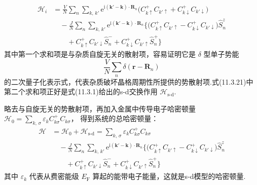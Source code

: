 \begin{equation}
\begin{aligned}
  \mathscr{H}_{i}&=\frac{V}{N}\sum_{n}\sum_{k,\,k'}
  \mathrm{e}^{\mathrm{i}(\boldsymbol{k}'-\boldsymbol{k})\cdot\boldsymbol{R}_{n}}
  \bigl(C^{+}_{k\uparrow}C_{k'\uparrow}
  +C^{+}_{k\downarrow}C_{k'\downarrow}\bigr)\\
  &\quad-\frac{J}{N}\sum_{n}\sum_{k,\,k'}
  \mathrm{e}^{\mathrm{i}(\boldsymbol{k}'-\boldsymbol{k})\cdot\boldsymbol{R}_{n}}
  \bigl\{\bigl(C^{+}_{k\uparrow}C_{k'\uparrow}
  -C^{+}_{k\downarrow}C_{k'\downarrow}\bigr)\hat{S}^{z}_{n}\\
  &\qquad+C^{+}_{k\uparrow}C_{k'\downarrow}\hat{S}^{-}_{n}
  +C^{+}_{k\downarrow}C_{k'\uparrow}\hat{S}^{+}_{n}\bigr\}
\end{aligned}
\end{equation}
其中第一个求和项是与杂质自旋无关的散射项，容易证明它是 $\delta$ 型单子势能
\begin{equation*}
  \frac{V}{N}\sum_{n}\delta(\boldsymbol{r}-\boldsymbol{R}_{n})
\end{equation*}
的二次量子化表示式，代表杂质破坏晶格周期性所提供的势散射项.式(11.3.21)中第二个求和项正好是式(11.3.1)给出的s-d交换作用 $\mathscr{H}_{\mathrm{s}\text{-}\mathrm{d}}$.

略去与自旋无关的势散射项，再加入金属中传导电子哈密顿量
$\mathscr{H}_{0}=\sum_{k,\,\sigma}\varepsilon_{k}C^{+}_{k\sigma}C_{k\sigma}$，
得到系统的总哈密顿量：
\begin{equation}
\begin{aligned}
  \mathscr{H}&=\mathscr{H}_{0}+\mathscr{H}_{\mathrm{s}\text{-}\mathrm{d}}
  =\sum_{k,\,\sigma}\varepsilon_{k}C^{+}_{k\sigma}C_{k\sigma}\\
  &\quad-\frac{J}{N}\sum_{n}\sum_{k,\,k'}
  \mathrm{e}^{\mathrm{i}(\boldsymbol{k}'-\boldsymbol{k})\cdot\boldsymbol{R}_{n}}
  \bigl\{\bigl(C^{+}_{k\uparrow}C_{k'\uparrow}
  -C^{+}_{k\downarrow}C_{k'\downarrow}\bigr)\hat{S}^{z}_{n}\\
  &\qquad+C^{+}_{k\uparrow}C_{k'\downarrow}\hat{S}^{-}_{n}
  +C^{+}_{k\downarrow}C_{k'\uparrow}\hat{S}^{+}_{n}\bigr\}
\end{aligned}
\end{equation}
其中 $\varepsilon_{k}$ 代表从费密能级 $E_{\mathrm{F}}$ 算起的能带电子能量，这就是s-d模型的哈密顿量.


